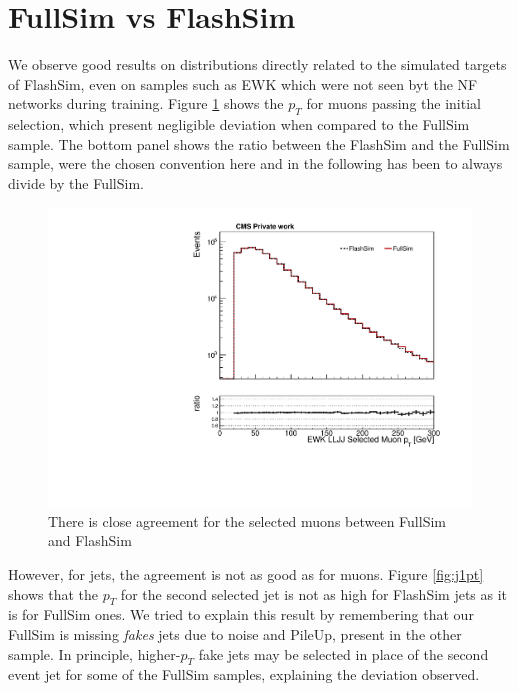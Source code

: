 \section{FullSim vs FlashSim}

We observe good results on distributions directly related to the simulated targets of FlashSim, even on samples such as EWK which were not seen byt the NF networks during training. Figure \ref{fig:selmuonpt} shows the $p_T$ for muons passing the initial selection, which present negligible deviation when compared to the FullSim sample. The bottom panel shows the ratio between the FlashSim and the FullSim sample, were the chosen convention here and in the following has been to always divide by the FullSim.

\begin{figure}
    \centering
    \includegraphics[width=\linewidth]{gfx/ch6/EWK_LLJJ_SelectedMuon_pt____log.pdf}
    \caption[Selected muon $p_T$]{There is close agreement for the selected muons between FullSim and FlashSim}
    \label{fig:selmuonpt}
\end{figure}

However, for jets, the agreement is not as good as for muons. Figure \ref{fig:j1pt} shows that the $p_T$ for the second selected jet is not as high for FlashSim jets as it is for FullSim ones. We tried to explain this result by remembering that our FullSim is missing \emph{fakes} jets due to noise and PileUp, present in the other sample. In principle, higher-$p_T$ fake jets may be selected in place of the second event jet for some of the FullSim samples, explaining the deviation observed. 

